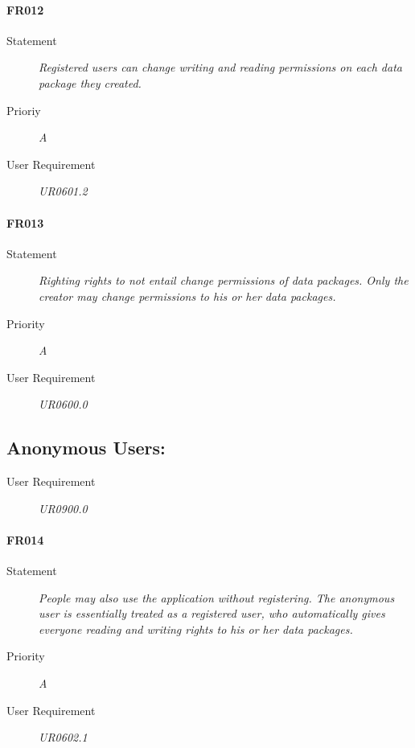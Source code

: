 \paragraph{FR012}
\begin{description}
  \item [Statement]
    \textit{
Registered users can change writing and reading permissions on each data package they created. 
}
  \item [Prioriy] \textit{A}
  \item[User Requirement] \textit{UR0601.2}
\end{description}

\paragraph{FR013}
\begin{description}
  \item [Statement]
    \textit{
Righting rights to not entail change permissions of data packages. Only the creator may change permissions to his or her data packages.
}
  \item [Priority] \textit{A}
  \item[User Requirement] \textit{UR0600.0}
\end{description}

\subsection{Anonymous Users:}

\begin{description}
\item[User Requirement] \textit{UR0900.0}
\end{description}


\paragraph{FR014}
\begin{description}
  \item [Statement]
    \textit{
People may also use the application without registering. The anonymous user is essentially treated as a registered user, who automatically gives everyone reading and writing rights to his or her data packages.
}
  \item [Priority] \textit{A}
  \item[User Requirement] \textit{UR0602.1}
\end{description}

